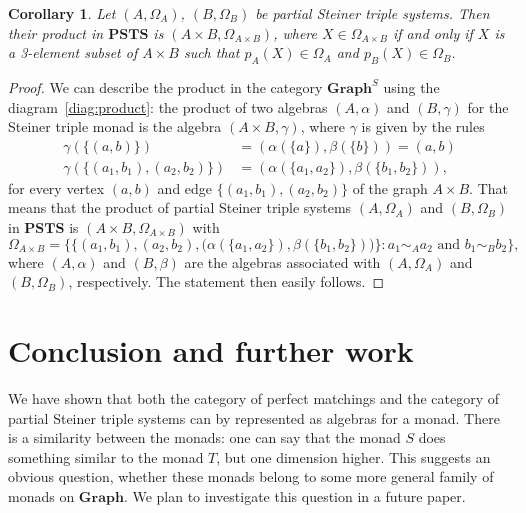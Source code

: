 \documentclass[reqno,A4paper]{amsart}
\newcommand{\PSTS}{\mathbf{PSTS}}
\newcommand{\Graph}{\mathbf{Graph}}
\newtheorem{corollary}[theorem]{Corollary}
\theoremstyle{definition}
\numberwithin{equation}{section}
\begin{document}
\begin{corollary}
Let $(A,\Omega_A)$, $(B,\Omega_B)$ be partial Steiner triple systems. Then their product
in $\PSTS$ is $(A\times B,\Omega_{A\times B})$, where
$X\in\Omega_{A\times B}$ if and only if $X$ is a 3-element subset of
$A\times B$ such that $p_A(X)\in\Omega_A$ and $p_B(X)\in\Omega_B$.
\end{corollary}
\begin{proof}
We can describe the product in the
category $\Graph^S$ using the diagram~\eqref{diag:product}: the product
of two algebras $(A,\alpha)$ and $(B,\gamma)$ for the Steiner triple monad
is the algebra $(A\times B,\gamma)$, where $\gamma$ is given by the rules
\begin{align*}
\gamma(\{(a,b)\})&=(\alpha(\{a\}),\beta(\{b\}))=(a,b)\\
\gamma(\{(a_1,b_1),(a_2,b_2)\})&=(\alpha(\{a_1,a_2\}),\beta(\{b_1,b_2\})),
\end{align*}
for every vertex $(a,b)$ and edge $\{(a_1,b_1),(a_2,b_2)\}$ of the graph $A\times B$. 
That means
that the product of partial Steiner triple systems $(A,\Omega_A)$ and
$(B,\Omega_B)$ in $\PSTS$ is $(A\times B,\Omega_{A\times B})$ with
$$
\Omega_{A\times B}=\{\{(a_1,b_1),(a_2,b_2),\bigl(\alpha(\{a_1,a_2\}),\beta(\{b_1,b_2\})\bigr)\}:a_1\sim_A a_2\text{ and }b_1\sim_B b_2\},
$$
where $(A,\alpha)$ and $(B,\beta)$ are the algebras associated with $(A,\Omega_A)$ and $(B,\Omega_B)$, respectively.
The statement then easily follows.
\end{proof}

\section{Conclusion and further work}

We have shown that both the category of perfect matchings and the category of
partial Steiner triple systems can by represented as algebras for a monad.
There is a similarity between the monads: one can say that the monad $S$ does something
similar to the monad $T$, but one dimension higher. This suggests an obvious question,
whether these monads belong to some more general family of monads on $\Graph$. We plan to investigate
this question in a future paper.
\end{document}
